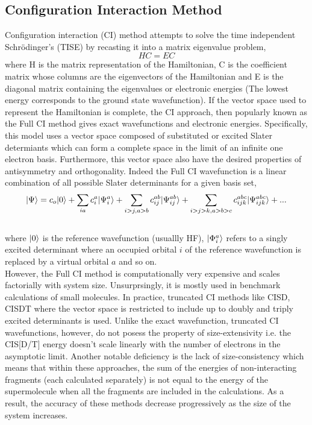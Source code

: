 \subsection{Configuration Interaction Method}
Configuration interaction (CI) method\cite{SherrillCI98} attempts to solve the time independent 
Schr\"odinger's (TISE) by recasting it into a matrix eigenvalue problem, 
\begin{equation}
HC = EC
\end{equation}
where H is the matrix representation of the Hamiltonian, C is the coefficient matrix
whose columns are the eigenvectors of the Hamiltonian and E is the diagonal matrix 
containing the eigenvalues or electronic energies (The lowest energy corresponds to 
the ground state wavefunction). If the vector space used to represent the Hamiltonian 
is complete, the CI approach, then popularly known as the Full CI method gives exact 
wavefunctions and electronic energies. Specifically, this model uses a vector space 
composed of substituted or excited Slater determiants which can form a complete
space in the limit of an infinite one electron basis. Furthermore, this vector space 
also have the desired properties of antisymmetry and orthogonality. Indeed the Full 
CI wavefunction is a linear combination of all possible Slater determinants for a given basis set,
\\
\begin{equation}
| \Psi \rangle = c_o| 0 \rangle + \sum_{ia}{c}_{i}^{a}| {\Psi}^a_i \rangle + \sum_{i>j,a>b}c_{ij}^{ab}| \Psi^{ab}_{ij} \rangle + \sum_{i>j>k,a>b>c}c_{ijk}^{abc}| \Psi^{abc}_{ijk} \rangle + ...
\end{equation}
\\
where $| 0 \rangle$ is the reference wavefunction (usuallly HF), $| {\Phi}^a_i \rangle$ refers to a singly excited determinant where an occupied orbital $i$ of the reference wavefunction is replaced by a virtual orbital $a$
and so on.\\
However, the Full CI method is computationally very expensive and scales factorially with 
system size. Unsurprsingly, it is mostly used in benchmark calculations of small molecules.
In practice, truncated CI methods like CISD, CISDT where the vector 
space is restricted to include up to doubly and triply excited determinants 
is used. Unlike the exact wavefunction, truncated CI wavefunctions, however, 
do not posess the property of size-extensivity i.e. the CIS[D/T] energy doesn't scale 
linearly with the number of electrons in the asymptotic limit. Another notable deficiency 
is the lack of size-consistency which means that within these approaches, the sum of the 
energies of non-interacting fragments (each calculated separately) is not equal to the energy 
of the supermolecule when all the fragments are included in the calculations.
As a result, the accuracy of these methods decrease progressively as the size of the system increases.
